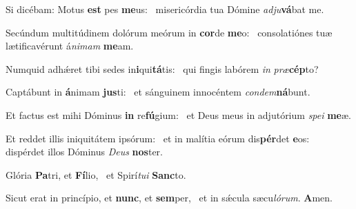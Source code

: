 \item Si dicébam: Motus \textbf{est} pes \textbf{me}us:~\psstar{} misericórdia tua Dómine \textit{adju}\textbf{vá}bat me.
\item Secúndum multitúdinem dolórum meórum in \textbf{cor}de \textbf{me}o:~\psstar{} consolatiónes tuæ lætificavérunt á\textit{nimam} \textbf{me}am.
\item Numquid adhǽret tibi sedes in\textbf{i}qui\textbf{tá}tis:~\psstar{} qui fingis labórem \textit{in} \textit{præ}\textbf{cép}to?
\item Captábunt in \textbf{á}nimam \textbf{jus}ti:~\psstar{} et sánguinem innocéntem \textit{condem}\textbf{ná}bunt.
\item Et factus est mihi Dóminus \textbf{in} re\textbf{fú}gium:~\psstar{} et Deus meus in adjutórium \textit{spei} \textbf{me}æ.
\item Et reddet illis iniquitátem ipsórum:~\pscross{} et in malítia eórum dis\textbf{pér}det \textbf{e}os:~\psstar{} dispérdet illos Dóminus \textit{Deus} \textbf{nos}ter.
\item Glória \textbf{Pa}tri, et \textbf{Fí}lio,~\psstar{} et Spirí\textit{tui} \textbf{Sanc}to.
\item Sicut erat in princípio, et \textbf{nunc}, et \textbf{sem}per,~\psstar{} et in sǽcula sæcu\textit{lórum}. \textbf{A}men.
